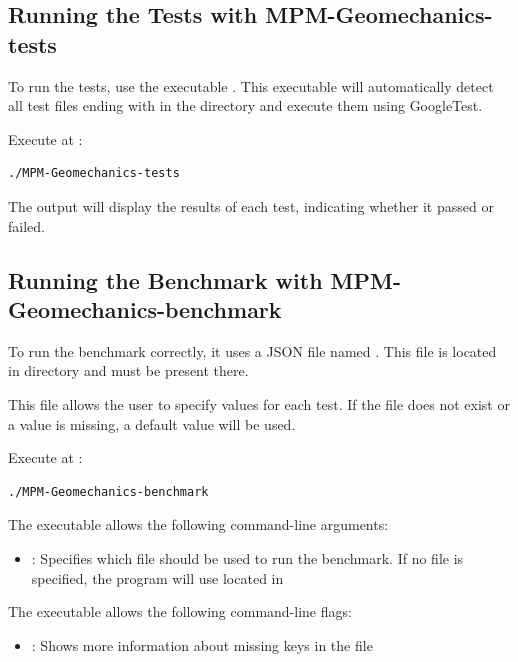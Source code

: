 \subsection {Running the Tests with MPM-Geomechanics-tests}

To run the tests, use the executable . This executable will automatically detect all test files ending with  in the  directory and execute them using GoogleTest.

Execute  at :
\begin{lstlisting}[language=bash]
	./MPM-Geomechanics-tests
\end{lstlisting}

The output will display the results of each test, indicating whether it passed or failed.

\subsection {Running the Benchmark with MPM-Geomechanics-benchmark}

To run the benchmark correctly, it uses a JSON file named . This file is located in  directory and must be present there. 

This file allows the user to specify values for each test. If the file does not exist or a value is missing, a default value will be used.

\par\medskip
Execute  at :
\begin{lstlisting}[language=bash]
	./MPM-Geomechanics-benchmark
\end{lstlisting}

The executable allows the following command-line arguments:
\begin{itemize}
	\item {}: Specifies which file should be used to run the benchmark. If no file is specified, the program will use  located in 
\end{itemize}

\par\medskip
The executable allows the following command-line flags:
\begin{itemize}
	\item {}: Shows more information about missing keys in the  file
\end{itemize}

